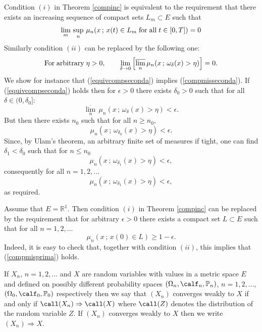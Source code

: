 \documentclass[preprint]{imsart}
\def\P{\mathbb P}
\def\R{\mathbb R}
\begin{document}
{\begin{Remark}\begin{em}
Condition $(i)$ in Theorem \ref{compinc} is equivalent
to the requirement that there exists an increasing
sequence of compact sets $L_m\subset E$ such that
\begin{equation}\label{equivcompprima}
\lim_m\, \sup_n\, \mu_n(x\, ;\,
x(t)\in L_m {\rm \; for \; all\;} t\in [0,T])=0
\end{equation}
Similarly condition $(ii)$ can be replaced by the
following one:
\begin{equation}\label{equivcompseconda}
{\rm For \; arbitrary \; }\eta >0,\qquad
\lim_{\delta\to 0}\left[
\overline{\lim_n}\, \mu_n(x\, ;\,
\omega_\delta (x)>\eta)\right]=0.
\end{equation}
We show for instance that (\ref{equivcompseconda})
implies (\ref{compmisseconda}).  If
(\ref{equivcompseconda}) holds then for $\epsilon >0$
there exists $\delta_0>0$ such that for all $\delta\in
(0,\delta_0]$:
$$
\overline{\lim_n}\, \mu_n(x\, ;\,
\omega_\delta (x)>\eta)<\epsilon .
$$
But then there exists $n_0$ such that for all $n\geq
n_0$,
$$
 \mu_n(x\, ;\,
\omega_{\delta_0} (x)>\eta)<\epsilon .
$$
 Since, by Ulam's theorem, an arbitrary finite
set of measures if tight, one can find
$\delta_1<\delta_0$ such that for $n\leq n_0$
$$
\mu_n(x\, ;\, \omega_{\delta_1}(x)>\eta)<\epsilon,
$$
consequently for all $n=1,2,\ldots$
$$
\mu_n(x\, ;\, \omega_{\delta_1}(x)>\eta)<\epsilon,
$$
as required.
\end{em}
\end{Remark}


\begin{Remark}\begin{em}
Assume that $E=\R^1$. Then condition $(i)$ in Theorem
\ref{compinc} can be replaced by the requirement that for
arbitrary $\epsilon >0$ there exists
  a compact set $L\subset E$ such that for all
  $n=1,2,\ldots$
$$
\mu_n (x\, ; \, x(0)\in L ) \geq 1-\epsilon.
$$
Indeed, it is easy to check that, together with
condition $(ii)$, this implies that
(\ref{compmisprima}) holds.
\end{em}
\end{Remark}



If $X_n$, $n=1,2,\ldots$ and $X$ are random variables
with values in a metric space $E$ and defined on
possibly different probability spaces
$(\Omega_n,\calf_n,\P_n)$, $n=1,2,\ldots$,
$(\Omega_0,\calf_0,\P_0)$ respectively then we say that
$(X_n)$ converges weakly to $X$ if and only if
$\call(X_n)\Rightarrow\call(X)$ where $\call (Z)$
denotes the distribution of the random variable $Z$. If
$(X_n)$ converges weakly to $X$ then we write
$(X_n)\Rightarrow X$.

}
\end{document}
